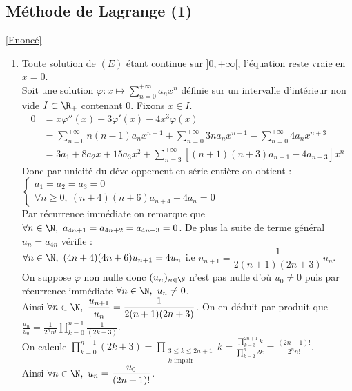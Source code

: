 \documentclass{book}
\begin{document}
	\subsection{Méthode de Lagrange (1) }
	\label{Méthode de Lagrange (1) corrigé}
	\textcolor{blue}{\hyperref[Méthode de Lagrange (1)]{[Enoncé]}}\\
	\begin{enumerate}[leftmargin=*]
		\item Toute solution de $(E)$ étant continue sur $]0,+\infty[$, l'équation reste vraie en $x=0$.\\
		Soit une solution $\varphi:x\mapsto \displaystyle\sum_{n=0}^{+\infty}a_nx^n$ définie sur un intervalle d'intérieur non vide $I\subset \R_+$ contenant $0$. Fixons $x\in I$.
		\begin{align*}
			0&=x\varphi''(x)+3\varphi'(x)-4x^3\varphi(x)\\
			&=\sum_{n=0}^{+\infty}n(n-1)a_nx^{n-1}+\sum_{n=0}^{+\infty}3na_nx^{n-1}-\sum_{n=0}^{+\infty}4a_nx^{n+3}\\
			&=3a_1+8a_2x+15a_3x^2+\sum_{n=3}^{+\infty}[(n+1)(n+3)a_{n+1}-4a_{n-3}]x^n
		\end{align*}
		Donc par unicité du développement en série entière on obtient :\\
		$\begin{cases}
			a_1=a_2=a_3=0\\
			\forall n\geq 0,\ (n+4)(n+6)a_{n+4}-4a_n=0
		\end{cases}$\\
		Par récurrence immédiate on remarque que $\forall n\in \N,\ a_{4n+1}=a_{4n+2}=a_{4n+3}=0$. De plus la suite de terme général $u_n=a_{4n}$ vérifie :\\
		$\forall n\in \N,\ (4n+4)(4n+6)u_{n+1}=4u_n$ i.e $u_{n+1}=\dfrac{1}{2(n+1)(2n+3)}u_n$.\\
		On suppose $\varphi$ non nulle donc $(u_n)_{n\in \N}$ n'est pas nulle d'où $u_0\ne 0$ puis par récurrence immédiate $\forall n\in \N,\ u_n\ne 0$.\\
		Ainsi $\forall n\in \N,\ \displaystyle\frac{u_{n+1}}{u_n}=\frac{1}{2(n+1)(2n+3)}$. On en déduit par produit que $\displaystyle\frac{u_n}{u_0}=\frac{1}{2^nn!}\prod_{k=0}^{n-1}\frac{1}{(2k+3)}$.\\
		On calcule $\displaystyle\prod_{k=0}^{n-1}(2k+3)=\prod_{\substack{3\leq k\leq 2n+1\\k\text{ impair}}}k=\frac{\prod\limits_{k=3}^{2n+1}k}{\prod\limits_{k=2}^n2k}=\frac{(2n+1)!}{2^nn!}$.\\
		Ainsi $\forall n\in \N,\ u_n=\dfrac{u_0}{(2n+1)!}$.\\

\end{enumerate}
\end{document}
